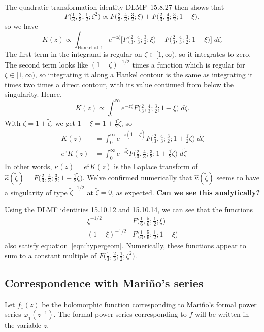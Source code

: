 \documentclass{article}
\theoremstyle{definition}
\theoremstyle{plain}
\begin{document}
The quadratic transformation identity DLMF~15.8.27 then shows that
\[ F\big(\tfrac{1}{3}, \tfrac{2}{3}; \tfrac{1}{2}; \zeta^2\big) \propto F\big(\tfrac{2}{3}, \tfrac{4}{3}; \tfrac{3}{2}; \xi\big) + F\big(\tfrac{2}{3}, \tfrac{4}{3}; \tfrac{3}{2}; 1-\xi\big), \]
so we have
\[ K(z) \propto \int_{\text{Hankel at } 1} e^{-z\zeta} \big[F\big(\tfrac{2}{3}, \tfrac{4}{3}; \tfrac{3}{2}; \xi\big) + F\big(\tfrac{2}{3}, \tfrac{4}{3}; \tfrac{3}{2}; 1-\xi\big)\big]\;d\zeta. \]
The first term in the integrand is regular on $\zeta \in [1, \infty)$, so it integrates to zero. The second term looks like $(1 - \zeta)^{-1/2}$ times a function which is regular for $\zeta \in [1, \infty)$, so integrating it along a Hankel contour is the same as integrating it times two times a direct contour, with its value continued from below the singularity. Hence,
\[ K(z) \propto \int^\infty_1 e^{-z\zeta} F\big(\tfrac{2}{3}, \tfrac{4}{3}; \tfrac{3}{2}; 1-\xi\big)\;d\zeta. \]
With $\zeta = 1 + \tilde{\zeta}$, we get $1 - \xi = 1 + \tfrac{1}{2} \tilde{\zeta}$, so
\begin{align*}
K(z) & = \int^\infty_0 e^{-z(1 + \tilde{\zeta})} F\big(\tfrac{2}{3}, \tfrac{4}{3}; \tfrac{3}{2}; 1 + \tfrac{1}{2}\tilde{\zeta}\big)\;d\tilde{\zeta} \\
e^z K(z) & = \int^\infty_0 e^{-z\tilde{\zeta}} F\big(\tfrac{2}{3}, \tfrac{4}{3}; \tfrac{3}{2}; 1 + \tfrac{1}{2}\tilde{\zeta}\big)\;d\tilde{\zeta}
\end{align*}
In other words, $\kappa(z) = e^z K(z)$ is the Laplace transform of $\hat{\kappa}(\tilde{\zeta}) = F\big(\tfrac{2}{3}, \tfrac{4}{3}; \tfrac{3}{2}; 1 + \tfrac{1}{2}\tilde{\zeta}\big)$. We've confirmed numerically that $\hat{\kappa}(\tilde{\zeta})$ seems to have a singularity of type $\tilde{\zeta}^{-1/2}$ at $\tilde{\zeta} = 0$, as expected. \textbf{Can we see this analytically?}

Using the DLMF identities 15.10.12 and 15.10.14, we can see that the functions
\begin{align*}
\xi^{-1/2} & F\big(\tfrac{1}{6}, \tfrac{5}{6}; \tfrac{1}{2}; \xi\big) \\
(1-\xi)^{-1/2} & F\big(\tfrac{1}{6}, \tfrac{5}{6}; \tfrac{1}{2}; 1-\xi\big)
\end{align*}
also satisfy equation~\ref{eqn:hypergeom}. Numerically, these functions appear to sum to a constant multiple of $F\big(\tfrac{1}{3}, \tfrac{2}{3}; \tfrac{1}{2}; \zeta^2\big)$.
\subsection{Correspondence with Mari\~{n}o's series}
Let $f_1(z)$ be the holomorphic function corresponding to Mari\~{n}o's formal power series $\varphi_1(z^{-1})$. The formal power series corresponding to $f$ will be written in the variable $z$.
\end{document}
